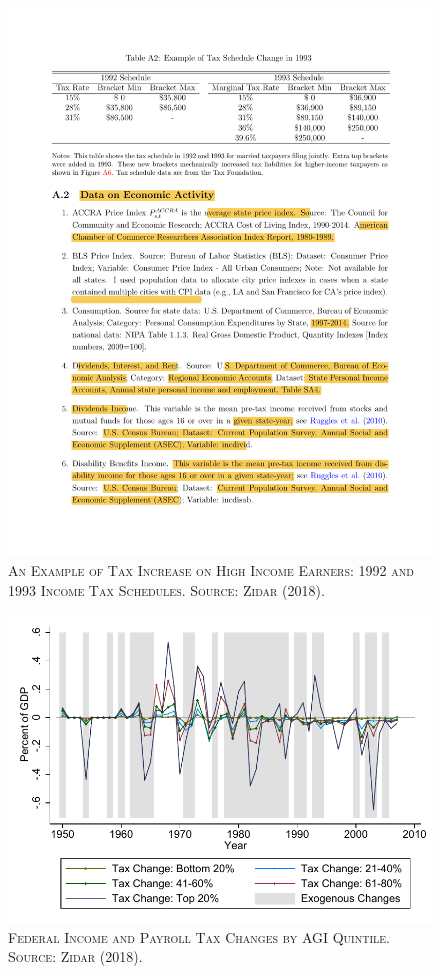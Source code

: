 \documentclass[]{book}
\begin{document}
\begin{figure}

{\centering \includegraphics[width=0.8\linewidth,height=0.8\textheight]{figures/Zidar2017/tabA2} 

}

\caption{\textsc{An Example of Tax Increase on High Income
Earners: 1992 and 1993 Income Tax Schedules. Source: Zidar (2018).}}\label{fig:zidar2017-tabA2}
\end{figure}




\begin{figure}

{\centering \includegraphics[width=0.8\linewidth,height=0.8\textheight]{figures/Zidar2017/fig2A} 

}

\caption{\textsc{Federal Income and Payroll Tax Changes by
AGI Quintile. Source: Zidar (2018).}}\label{fig:zidar2017-fig2A}
\end{figure}
\end{document}
